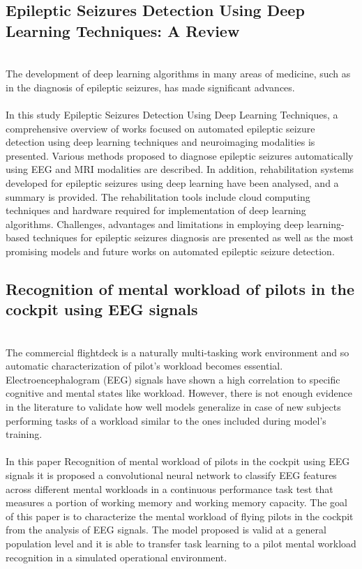 \subsection{Epileptic Seizures Detection Using Deep Learning Techniques: A Review}
\leavevmode\\
The development of deep learning algorithms in many areas of medicine, such as in the diagnosis of epileptic seizures, has made significant advances.
\\\\
In this study Epileptic Seizures Detection Using Deep Learning Techniques\cite{relatedwork2}, a comprehensive overview of works focused on automated epileptic seizure detection using deep learning techniques and neuroimaging modalities is presented. Various methods proposed to diagnose epileptic seizures automatically using EEG and MRI modalities are described. In addition, rehabilitation systems developed for epileptic seizures using deep learning have been analysed, and a summary is provided. The rehabilitation tools include cloud computing techniques and hardware required for implementation of deep learning algorithms. Challenges, advantages and limitations in employing deep learning-based techniques for epileptic seizures diagnosis are presented as well as the most promising models and future works on automated epileptic seizure detection.
\\


\subsection{Recognition of mental workload of pilots in the cockpit using EEG signals}
\leavevmode\\
The commercial flightdeck is a naturally multi-tasking work environment and so automatic characterization of pilot’s workload becomes essential. Electroencephalogram (EEG) signals have shown a high correlation to specific cognitive and mental states like workload. However, there is not enough evidence in the literature to validate how well models generalize in case of new subjects performing tasks of a workload similar to the ones included during model’s training.
\\\\
In this paper Recognition of mental workload of pilots in the cockpit using EEG signals\cite{relatedwork3} it is proposed a convolutional neural network to classify EEG features across different mental workloads in a continuous performance task test that measures a portion of working memory and working memory capacity. The goal of this paper is to characterize the mental workload of flying pilots in the cockpit from the analysis of EEG signals. The model proposed is valid at a general population level and it is able to transfer task learning to a pilot mental workload recognition in a simulated operational environment.
\\